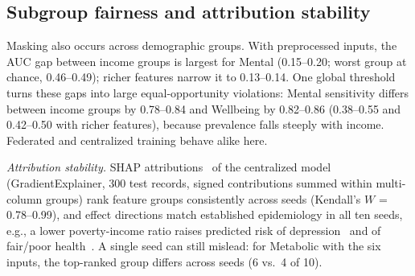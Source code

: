 \subsection{Subgroup fairness and attribution stability}

Masking also occurs across demographic groups. With preprocessed inputs, the AUC gap between income groups is largest for Mental (0.15--0.20; worst group at chance, 0.46--0.49); richer features narrow it to 0.13--0.14. One global threshold turns these gaps into large equal-opportunity violations: Mental sensitivity differs between income groups by 0.78--0.84 and Wellbeing by 0.82--0.86 (0.38--0.55 and 0.42--0.50 with richer features), because prevalence falls steeply with income. Federated and centralized training behave alike here.

\emph{Attribution stability.} SHAP attributions~\cite{lundberg2017} of the centralized model (GradientExplainer, 300 test records, signed contributions summed within multi-column groups) rank feature groups consistently across seeds (Kendall's $W$ = 0.78--0.99), and effect directions match established epidemiology in all ten seeds, e.g., a lower poverty-income ratio raises predicted risk of depression~\cite{lorant2003} and of fair/poor health~\cite{braveman2014}. A single seed can still mislead: for Metabolic with the six inputs, the top-ranked group differs across seeds (6 vs.\ 4 of 10).
